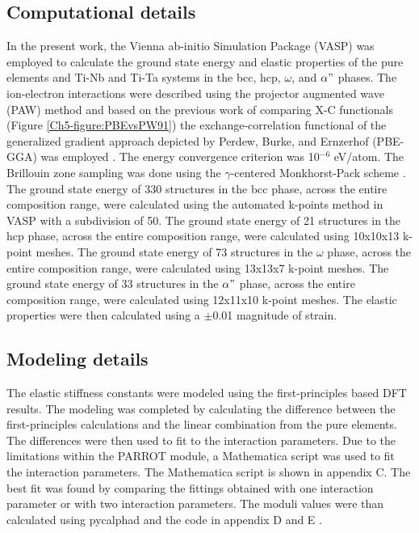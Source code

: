 \subsection{Computational details}

In the present work, the Vienna ab-initio Simulation Package (VASP) \cite{Kresse1996} was employed to calculate the ground state energy and elastic properties of the pure elements and Ti-Nb and Ti-Ta systems in the bcc, hcp, $\omega$, and $\alpha"$ phases. The ion-electron interactions were described using the projector augmented wave (PAW) \cite{Kresse1999,Blochl1994} method and based on the previous work of comparing X-C functionals (Figure \ref{Ch5-figure:PBEvsPW91}) the exchange-correlation functional of the generalized gradient approach depicted by Perdew, Burke, and Ernzerhof (PBE-GGA) was employed \cite{Perdew1996a}. The energy convergence criterion was 10$^{-6}$ eV/atom. The Brillouin zone sampling was done using the $\gamma$-centered Monkhorst-Pack scheme \cite{Monkhorst1976a}. The ground state energy of 330 structures in the bcc phase, across the entire composition range, were calculated using the automated k-points method in VASP with a subdivision of 50. The ground state energy of 21 structures in the hcp phase, across the entire composition range, were calculated using 10x10x13 k-point meshes. The ground state energy of 73 structures in the $\omega$ phase, across the entire composition range, were calculated using 13x13x7 k-point meshes. The ground state energy of 33 structures in the $\alpha"$ phase, across the entire composition range, were calculated using 12x11x10 k-point meshes. The elastic properties were then calculated using a $\pm$0.01 magnitude of strain.

\subsection{Modeling details}

The elastic stiffness constants were modeled using the first-principles based DFT results. The modeling was completed by calculating the difference between the first-principles calculations and the linear combination from the pure elements. The differences were then used to fit to the interaction parameters. Due to the limitations within the PARROT module, a Mathematica script was used to fit the interaction parameters. The Mathematica script is shown in appendix C. The best fit was found by comparing the fittings obtained with one interaction parameter or with two interaction parameters. The moduli values were than calculated using pycalphad and the code in appendix D and E \cite{Otis2017}.

